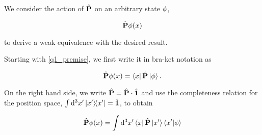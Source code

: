 We consider the action of $\hat{\textbf{P}}$ on an arbitrary
state $\phi$, 

\begin{equation}
    \hat{\textbf{P}} \phi(x) 
    \label{q1_premise}
\end{equation}

to derive a weak equivalence with the desired result.

Starting with \cref{q1_premise}, we first write it in
bra-ket notation as

\begin{equation}
    \hat{\textbf{P}} \phi(x) = 
        \bra{x} \hat{\textbf{P}} \ket{\phi}.
\end{equation}

On the right hand side, we write $\hat{\textbf{P}} = \hat{\textbf{P}} \cdot \hat{\textbf{1}}$
and use the completeness relation for the position space,
$\int \dd[3]{x'} \ketbra{x'}{x'} = \hat{\textbf{1}}$,
to obtain

\begin{equation}
    \hat{\textbf{P}} \phi(x) = \int \dd[3]{x'} \bra{x} 
                                        \hat{\textbf{P}} \ket{x'}
                                        \braket{x'}{\phi}
\end{equation}


